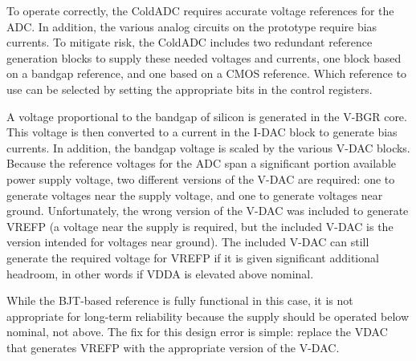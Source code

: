 \label{sec:5.8}

To operate correctly, the ColdADC requires accurate voltage references for the ADC. In addition, the various analog circuits on the prototype require bias currents. To mitigate risk, the ColdADC includes two redundant reference generation blocks to supply these needed voltages and currents, one block based on a bandgap reference, and one based on a CMOS reference. Which reference to use can be selected by setting the appropriate bits in the control registers.

A voltage proportional to the bandgap of silicon is generated in the V-BGR core. This voltage is then converted to a current in the I-DAC block to generate bias currents. In addition, the bandgap voltage is scaled by the various V-DAC blocks. Because the reference voltages for the ADC span a significant portion available power supply voltage, two different versions of the V-DAC are required: one to generate voltages near the supply voltage, and one to generate voltages near ground. Unfortunately, the wrong version of the V-DAC was included to generate VREFP (a voltage near the supply is required, but the included V-DAC is the version intended for voltages near ground). The included V-DAC can still generate the required voltage for VREFP if it is given significant additional headroom, in other words if VDDA is elevated above nominal.

While the BJT-based reference is fully functional in this case, it is not appropriate for long-term reliability because the supply should be operated below nominal, not above. The fix for this design error is simple: replace the VDAC that generates VREFP with the appropriate version of the V-DAC.

